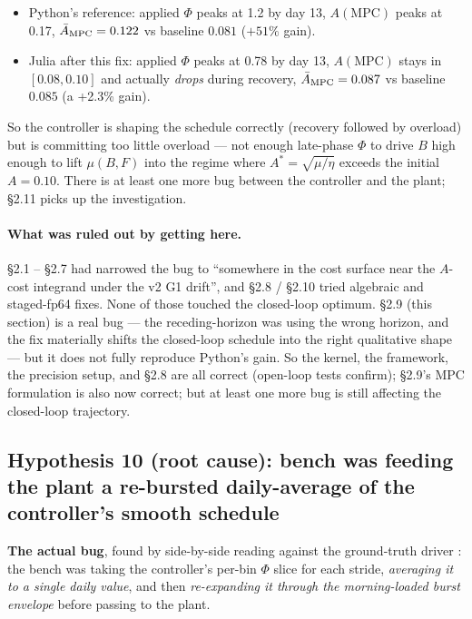 \documentclass[11pt,a4paper]{article}
\begin{document}
\begin{itemize}[itemsep=2pt]
\item Python's reference: applied $\Phi$ peaks at 1.2 by day 13,
  $A(\mathrm{MPC})$ peaks at 0.17, $\bar A_{\rm MPC} = 0.122$ vs
  baseline $0.081$ ($+51\%$ gain).
\item Julia after this fix: applied $\Phi$ peaks at 0.78 by day 13,
  $A(\mathrm{MPC})$ stays in $[0.08, 0.10]$ and actually \emph{drops}
  during recovery, $\bar A_{\rm MPC} = 0.087$ vs baseline $0.085$
  (a +2.3\% gain).
\end{itemize}

So the controller is shaping the schedule correctly (recovery
followed by overload) but is committing too little overload --- not
enough late-phase $\Phi$ to drive $B$ high enough to lift $\mu(B,F)$
into the regime where $A^* = \sqrt{\mu/\eta}$ exceeds the initial
$A = 0.10$. There is at least one more bug between the controller
and the plant; \S2.11 picks up the investigation.

\paragraph{What was ruled out by getting here.}
\S2.1 -- \S2.7 had narrowed the bug to ``somewhere in the cost
surface near the $A$-cost integrand under the v2 G1 drift'', and
\S2.8 / \S2.10 tried algebraic and staged-fp64 fixes. None of those
touched the closed-loop optimum. \S2.9 (this section) is a real bug
--- the receding-horizon was using the wrong horizon, and the fix
materially shifts the closed-loop schedule into the right qualitative
shape --- but it does not fully reproduce Python's gain. So the
kernel, the framework, the precision setup, and \S2.8 are all
correct (open-loop tests confirm); \S2.9's MPC formulation is also
now correct; but at least one more bug is still affecting the
closed-loop trajectory.

\subsection{Hypothesis 10 (root cause): bench was feeding the plant a re-bursted daily-average of the controller's smooth schedule}

\textbf{The actual bug}, found by side-by-side reading against the
ground-truth driver
: the bench was taking the
controller's per-bin $\Phi$ slice for each stride, \emph{averaging it
to a single daily value}, and then \emph{re-expanding it through the
morning-loaded burst envelope} before passing to the plant.
\end{document}
